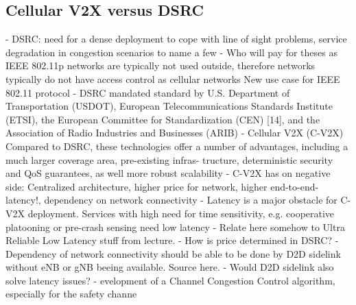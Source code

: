\documentclass[conference,12pt,onecolumn]{IEEEtran}
\begin{document}
\subsection{Cellular V2X versus DSRC}
- DSRC: need for a dense deployment to cope with line of sight problems, service degradation in congestion scenarios to name a few \cite{machardy2018}
- Who will pay for theses as IEEE 802.11p networks are typically not used outside, therefore networks typically do not have access control as cellular networks \cite{machardy2018} New use case for IEEE 802.11 protocol
- DSRC mandated standard by U.S. Department of Transportation (USDOT), European Telecommunications Standards Institute (ETSI), the European Committee for Standardization (CEN) [14], and the Association of Radio Industries and Businesses (ARIB) \cite{machardy2018}
- Cellular V2X (C-V2X) Compared to DSRC, these technologies offer a number of advantages, including a much larger coverage area, pre-existing infras- tructure, deterministic security and QoS guarantees, as well more robust scalability \cite{machardy2018}
- C-V2X has on negative side: Centralized architecture, higher price for network, higher end-to-end-latency!, dependency on network connectivity \cite{machardy2018}
- Latency is a major obstacle for C-V2X deployment. Services with high need for time sensitivity, e.g. cooperative platooning or pre-crash sensing need low latency \cite{machardy2018}
- Relate here somehow to Ultra Reliable Low Latency stuff from lecture.
- How is price determined in DSRC?
- Dependency of network connectivity should be able to be done by D2D sidelink without eNB or gNB beeing available. Source here.
- Would D2D sidelink also solve latency issues?
- evelopment of a Channel Congestion Control
algorithm, especially for the safety channe \cite{kenney2011}
\end{document}
